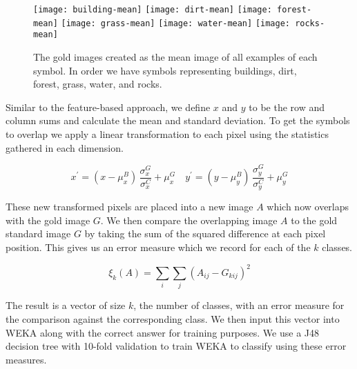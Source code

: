 
\begin{figure}[h]
\texttt{[image: building-mean]}
\texttt{[image: dirt-mean]}
\texttt{[image: forest-mean]}
\texttt{[image: grass-mean]}
\texttt{[image: water-mean]}
\texttt{[image: rocks-mean]}
\caption{The gold images created as the mean image of all examples of each symbol.
In order we have symbols representing buildings, dirt, forest, grass, water, and rocks.}
\end{figure}

Similar to the feature-based approach, we define $x$ and $y$ to be the row and column sums
and calculate the mean and standard deviation. To get the symbols to overlap we apply a
linear transformation to each pixel using the statistics gathered in each dimension.

\begin{equation} \label{eq:gold}
x^{\prime} = (x - \mu^{B}_{x}) \, \frac{\sigma^{G}_{x}}{\sigma^{C}_{x}} + \mu^{G}_{x} \quad
y^{\prime} = (y - \mu^{B}_{y}) \, \frac{\sigma^{G}_{y}}{\sigma^{C}_{y}} + \mu^{G}_{y}
\end{equation}

These new transformed pixels are placed into a new image $A$ which now overlaps with the
gold image $G$.
We then compare the overlapping image $A$ to the gold standard image $G$ by taking the sum
of the squared difference at each pixel position. This gives us an error measure which we
record for each of the $k$ classes.

\[ \xi_{k}(A) = \sum_{i}\sum_{j}{(A_{ij} - G_{kij})^{2}} \]

The result is a vector of size $k$, the number of classes, with an error measure for the
comparison against the corresponding class. We then input this vector into WEKA along
with the correct answer for training purposes. We use a J48 decision tree with 10-fold
validation to train WEKA to classify using these error measures.

